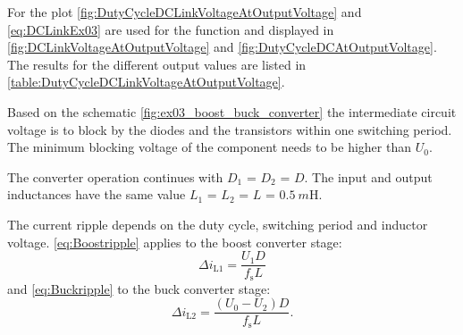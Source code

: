 \begin{solutionblock}
    For the plot \eqref{fig:DutyCycleDCLinkVoltageAtOutputVoltage} and \eqref{eq:DCLinkEx03} are used for the function and 
    displayed in \autoref{fig:DCLinkVoltageAtOutputVoltage} and \autoref{fig:DutyCycleDCAtOutputVoltage}. The results for the different output values are listed in \autoref{table:DutyCycleDCLinkVoltageAtOutputVoltage}.

    
    


    
\end{solutionblock}


\begin{solutionblock}
    Based on the schematic \autoref{fig:ex03_boost_buck_converter} the intermediate circuit voltage is to block by the diodes and 
    the transistors within one switching period. The minimum blocking voltage of the component needs to be higher than $U_\mathrm{0}$.
\end{solutionblock}

\vspace{2em}\par
The converter operation continues with $D_\mathrm{1}$ = $D_\mathrm{2}$ = $D$. The input and output inductances 
have the same value $L_\mathrm{1}$ = $L_\mathrm{2}$ = $L$ = $\SI{0.5}{m\henry}$.


\begin{solutionblock}
    The current ripple depends on the duty cycle, switching period and inductor voltage.
    \eqref{eq:Boostripple} applies to the boost converter stage:
    \begin{equation}
        \Delta i_\mathrm{L1}=\frac{U_\mathrm{1}D}{f_\mathrm{s}L}
        \label{eq:Boostripple}
    \end{equation}
    and \eqref{eq:Buckripple} to the buck converter stage:
    \begin{equation}
        \Delta i_\mathrm{L2}=\frac{\left(U_\mathrm{0}-U_\mathrm{2}\right)D}{f_\mathrm{s}L}.
        \label{eq:Buckripple}
    \end{equation}
\end{solutionblock}

